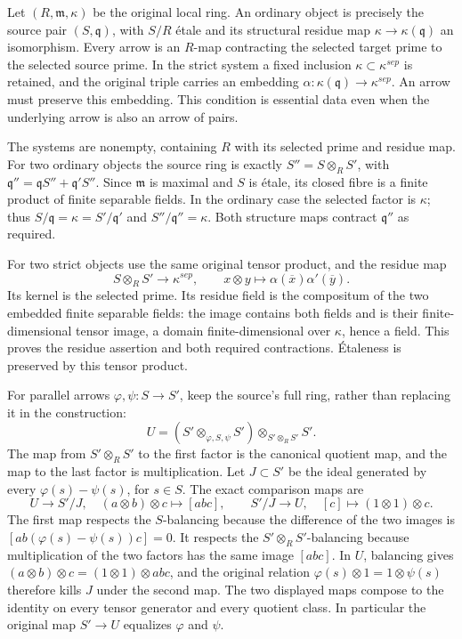 Let \((R,\mathfrak m,\kappa)\) be the original local ring. An ordinary object is precisely the source pair \((S,\mathfrak q)\), with \(S/R\) étale and its structural residue map \(\kappa\to\kappa(\mathfrak q)\) an isomorphism. Every arrow is an \(R\)-map contracting the selected target prime to the selected source prime. In the strict system a fixed inclusion \(\kappa\subset\kappa^{sep}\) is retained, and the original triple carries an embedding \(\alpha:\kappa(\mathfrak q)\to\kappa^{sep}\). An arrow must preserve this embedding. This condition is essential data even when the underlying arrow is also an arrow of pairs.

The systems are nonempty, containing \(R\) with its selected prime and residue map. For two ordinary objects the source ring is exactly \(S''=S\otimes_R S'\), with \(\mathfrak q''=\mathfrak qS''+\mathfrak q'S''\). Since \(\mathfrak m\) is maximal and \(S\) is étale, its closed fibre is a finite product of finite separable fields. In the ordinary case the selected factor is \(\kappa\); thus \(S/\mathfrak q=\kappa=S'/\mathfrak q'\) and \(S''/\mathfrak q''=\kappa\). Both structure maps contract \(\mathfrak q''\) as required.

For two strict objects use the same original tensor product, and the residue map \[
 S\otimes_R S'\longrightarrow\kappa^{sep},\qquad
 x\otimes y\longmapsto\alpha(\overline x)\alpha'(\overline y).
\] Its kernel is the selected prime. Its residue field is the compositum of the two embedded finite separable fields: the image contains both fields and is their finite-dimensional tensor image, a domain finite-dimensional over \(\kappa\), hence a field. This proves the residue assertion and both required contractions. Étaleness is preserved by this tensor product.

For parallel arrows \(\varphi,\psi:S\to S'\), keep the source's full ring, rather than replacing it in the construction: \[
 U=(S'\otimes_{\varphi,S,\psi}S')\otimes_{S'\otimes_R S'}S'.
\] The map from \(S'\otimes_R S'\) to the first factor is the canonical quotient map, and the map to the last factor is multiplication. Let \(J\subset S'\) be the ideal generated by every \(\varphi(s)-\psi(s)\), for \(s\in S\). The exact comparison maps are \[
 U\longrightarrow S'/J,\quad (a\otimes b)\otimes c\longmapsto[abc],
 \qquad
 S'/J\longrightarrow U,\quad[c]\longmapsto(1\otimes1)\otimes c.
\] The first map respects the \(S\)-balancing because the difference of the two images is \([ab(\varphi(s)-\psi(s))c]=0\). It respects the \(S'\otimes_R S'\)-balancing because multiplication of the two factors has the same image \([abc]\). In \(U\), balancing gives \((a\otimes b)\otimes c=(1\otimes1)\otimes abc\), and the original relation \(\varphi(s)\otimes1=1\otimes\psi(s)\) therefore kills \(J\) under the second map. The two displayed maps compose to the identity on every tensor generator and every quotient class. In particular the original map \(S'\to U\) equalizes \(\varphi\) and \(\psi\).

